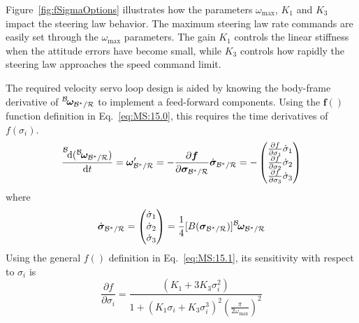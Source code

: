 \documentclass[]{BasiliskReportMemo}
\begin{document}
Figure~\ref{fig:fSigmaOptions} illustrates how the parameters $\omega_{\text{max}}$, $K_{1}$ and $K_{3}$ impact the steering law behavior.  The maximum steering law rate commands are easily set through the $\omega_{\text{max}}$ parameters.  The gain $K_{1}$ controls the linear stiffness when the attitude errors have become small, while $K_{3}$ controls how rapidly the steering law approaches the speed command limit.

The required velocity servo loop design is aided by knowing the body-frame derivative of $\leftexp{B}{\bm\omega}_{{\mathcal{B}}^{\ast}/\mathcal{R}}$ to implement a feed-forward components.  Using the $\bm f()$ function definition in Eq.~\eqref{eq:MS:15.0}, this requires the time derivatives of $f(\sigma_{i})$.  
\begin{equation}
	\frac{\leftexp{B}{\D (\leftexp{B}{\bm\omega}_{{\mathcal{B}}^{\ast}/\mathcal{R}} ) }}{\D t} =
	{\bm\omega}_{{\mathcal{B}}^{\ast}/\mathcal{R}} '
	= - \frac{\partial \bm f}{\partial \bm \sigma_{{\mathcal{B}}^{\ast}/\mathcal{R}}} \dot{\bm \sigma}_{{\mathcal{B}}^{\ast}/\mathcal{R}}
	= - \begin{pmatrix}
		\frac{\partial  f}{\partial  \sigma_{1}} \dot{ \sigma}_{1} \\
		\frac{\partial  f}{\partial  \sigma_{2}} \dot{ \sigma}_{2} \\
		\frac{\partial  f}{\partial  \sigma_{3}} \dot{ \sigma}_{3} 
	\end{pmatrix}
\end{equation}
where
\begin{equation}
	\dot{\bm\sigma}	_{{\mathcal{B}}^{\ast}/\mathcal{R}} = 
	\begin{pmatrix}
		\dot\sigma_{1}\\
		\dot\sigma_{2}\\
		\dot\sigma_{3}
	\end{pmatrix} = 
	 \frac{1}{4}[B(\bm\sigma_{{\mathcal{B}}^{\ast}/\mathcal{R}})] 
	\leftexp{B}{\bm\omega}_{{\mathcal{B}}^{\ast}/\mathcal{R}}
\end{equation}
Using the general $f()$ definition in Eq.~\eqref{eq:MS:15.1}, its sensitivity with respect to $\sigma_{i}$ is
\begin{equation}
	\frac{
		\partial f
	}{
		\partial \sigma_{i}
	} = 
	\frac{
	(K_{1}  + 3 K_{3} \sigma_{i}^{2})
	}{
	1+(K_{1}\sigma_{i} + K_{3} \sigma_{i}^{3})^{2} \left(\frac{\pi}{2 \omega_{\text{max}}}\right)^{2}
	}
\end{equation}
\end{document}
